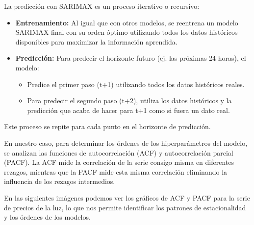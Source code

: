 La predicción con SARIMAX es un proceso iterativo o recursivo:
\begin{itemize}
    \item \textbf{Entrenamiento:} Al igual que con otros modelos, se reentrena un modelo SARIMAX final con su orden óptimo utilizando todos los datos históricos disponibles para maximizar la información aprendida.
    
    \item \textbf{Predicción:} Para predecir el horizonte futuro (ej. las próximas 24 horas), el modelo:
    \begin{itemize}
        \item Predice el primer paso (t+1) utilizando todos los datos históricos reales.
        \item Para predecir el segundo paso (t+2), utiliza los datos históricos y la predicción que acaba de hacer para t+1 como si fuera un dato real.
    \end{itemize}
\end{itemize}

Este proceso se repite para cada punto en el horizonte de predicción.

En nuestro caso, para determinar los órdenes de los hiperparámetros del modelo, se analizan las funciones de autocorrelación (ACF) y autocorrelación parcial (PACF). La ACF mide la correlación de la serie consigo misma en diferentes rezagos, mientras que la PACF mide esta misma correlación eliminando la influencia de los rezagos intermedios.

En las siguientes imágenes podemos ver los gráficos de ACF y PACF para la serie de precios de la luz, lo que nos permite identificar los patrones de estacionalidad y los órdenes de los modelos.

